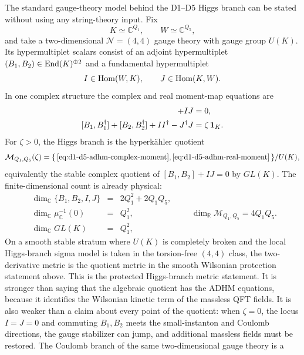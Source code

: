 \begin{example}[Two-dimensional \(\mathcal N=(4,4)\) ADHM Higgs branch]
\label{ex:d1-d5-adhm-higgs-branch}
The standard gauge-theory model behind the D1--D5 Higgs branch can be stated
without using any string-theory input.  Fix
\[
  K\simeq\mathbb C^{Q_1},\qquad W\simeq\mathbb C^{Q_5},
\]
and take a two-dimensional \(\mathcal N=(4,4)\) gauge theory with gauge group
\(U(K)\).  Its hypermultiplet scalars consist of an adjoint hypermultiplet
\((B_1,B_2)\in{\rm End}(K)^{\oplus2}\) and a fundamental hypermultiplet
\[
  I\in{\rm Hom}(W,K),\qquad J\in{\rm Hom}(K,W).
\]
In one complex structure the complex and real moment-map equations are
\begin{align}
  [B_1,B_2]+IJ&=0,
  \label{eq:d1-d5-adhm-complex-moment}\\
  [B_1,B_1^\dagger]+[B_2,B_2^\dagger]+II^\dagger-J^\dagger J
  &=\zeta\,{\bf 1}_K .
  \label{eq:d1-d5-adhm-real-moment}
\end{align}
For \(\zeta>0\), the Higgs branch is the hyperk\"ahler quotient
\begin{equation}
  \mathcal M_{Q_1,Q_5}(\zeta)
  =
  \{\,\eqref{eq:d1-d5-adhm-complex-moment},
       \eqref{eq:d1-d5-adhm-real-moment}\,\}/U(K),
  \label{eq:d1-d5-adhm-higgs-quotient}
\end{equation}
equivalently the stable complex quotient of
\([B_1,B_2]+IJ=0\) by \(GL(K)\).  The finite-dimensional count is already
physical:
\[
\begin{array}{rcl}
\dim_{\mathbb C}\{B_1,B_2,I,J\}&=&2Q_1^2+2Q_1Q_5,\\
\dim_{\mathbb C}\mu_{\mathbb C}^{-1}(0)&=&Q_1^2,\\
\dim_{\mathbb C}GL(K)&=&Q_1^2,
\end{array}
\qquad
\dim_{\mathbb R}\mathcal M_{Q_1,Q_5}=4Q_1Q_5 .
\]
On a smooth stable stratum where \(U(K)\) is completely broken and the local
Higgs-branch sigma model is taken in the torsion-free \((4,4)\) class, the
two-derivative metric is the quotient metric in the smooth Wilsonian protection
statement above.  This is the protected Higgs-branch metric statement.  It is
stronger than saying that the algebraic quotient has the ADHM equations,
because it identifies the Wilsonian kinetic term of the massless QFT fields.
It is also weaker than a
claim about every point of the quotient: when \(\zeta=0\), the locus
\(I=J=0\) and commuting \(B_1,B_2\) meets the small-instanton and Coulomb
directions, the gauge stabilizer can jump, and additional massless fields must
be restored.  The Coulomb branch of the same two-dimensional gauge theory is a

\end{example}
